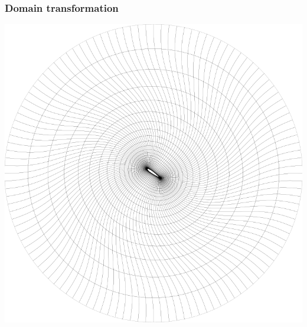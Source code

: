 \documentclass{beamer}
\begin{document}
\begin{frame}
  \frametitle{Domain transformation}

  \begin{center}
    \includegraphics[width=0.85\textheight]{figs/domain}
  \end{center}
\end{frame}
\end{document}
